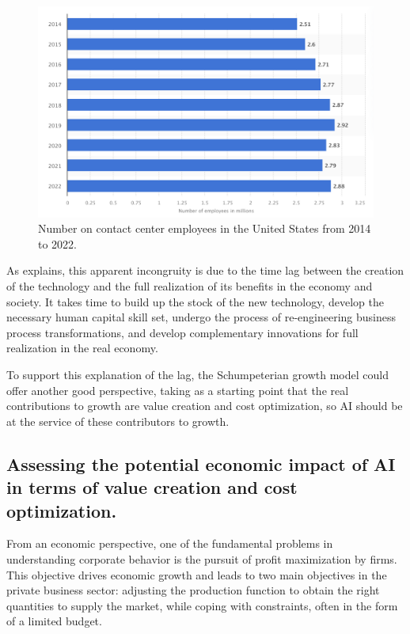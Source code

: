 \documentclass[preprint, 3p,
authoryear]{elsarticle} %
\begin{document}
\begin{figure}

{\centering \includegraphics[width=0.7\linewidth]{../Views/contact_center_employees_US} 

}

\caption{\label{fig1}Number on contact center employees in the United States from 2014 to 2022.}\label{fig:fig1}
\end{figure}

As \citep{paradox} explains, this apparent incongruity is due to the
time lag between the creation of the technology and the full realization
of its benefits in the economy and society. It takes time to build up
the stock of the new technology, develop the necessary human capital
skill set, undergo the process of re-engineering business process
transformations, and develop complementary innovations for full
realization in the real economy.

To support this explanation of the lag, the Schumpeterian growth model
could offer another good perspective, taking as a starting point that
the real contributions to growth are value creation and cost
optimization, so AI should be at the service of these contributors to
growth.

\hypertarget{assessing-the-potential-economic-impact-of-ai-in-terms-of-value-creation-and-cost-optimization.}{%
\subsection{Assessing the potential economic impact of AI in terms of
value creation and cost
optimization.}\label{assessing-the-potential-economic-impact-of-ai-in-terms-of-value-creation-and-cost-optimization.}}

From an economic perspective, one of the fundamental problems in
understanding corporate behavior is the pursuit of profit maximization
by firms. This objective drives economic growth and leads to two main
objectives in the private business sector: adjusting the production
function to obtain the right quantities to supply the market, while
coping with constraints, often in the form of a limited budget.
\end{document}
